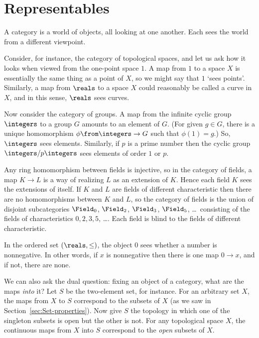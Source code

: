 % 
% 
% 

\chapter{Representables}
\label{ch:rep}


A category is a world of objects, all looking at one another.  Each sees
the world from a different viewpoint.  

Consider, for instance, the category of topological spaces, and let us ask
how it looks when viewed from the one-point space $1$.  A map from $1$ to a
space $X$ is essentially the same thing as a point of $X$, so we might say
that $1$ `sees%
%
%
points'.  Similarly, a map from $\reals$ to a space $X$
could reasonably be called a curve in $X$, and in this sense, $\reals$ sees
curves.

Now consider the category of groups.  A map from the infinite
cyclic group $\integers$%
%
%
to a group $G$ amounts to an element of $G$.  (For given $g \in G$, there
is a unique homomorphism $\phi\from \integers \to G$ such that $\phi(1) =
g$.)  So, $\integers$ sees elements.  Similarly, if $p$ is a prime number
then the cyclic group $\integers/p\integers$ sees elements of order $1$ or
$p$.

Any ring homomorphism between fields is injective, so in the category of
fields,%
%
%
a map $K \to L$ is a way of realizing $L$ as an extension of $K$.  Hence
each field $K$ sees the extensions of itself.  If $K$ and $L$ are fields of
different characteristic then there are no homomorphisms between $K$ and
$L$, so the category of fields is the union of disjoint subcategories
$\Field_0$, $\Field_2$, $\Field_3$, $\Field_5$, \ldots\ consisting of the
fields of characteristics $0, 2, 3, 5$, \ldots.  Each field is blind to the
fields of different characteristic.

In the ordered set $(\reals, \mathord{\leq})$, the object $0$ sees whether
a number is nonnegative.  In other words, if $x$ is nonnegative then
there is one map $0 \to x$, and if not, there are none.

We can also ask the dual question: fixing an object of a category, what are
the maps \emph{into} it?  Let $S$ be the two-element set, for instance.
For an arbitrary set $X$, the maps from $X$ to $S$ correspond to the
subsets of $X$ (as we saw in Section~\ref{sec:Set-properties}).  Now give
$S$ the topology in which one of the singleton subsets is open but the
other is not.  For any topological space $X$, the continuous maps from $X$
into $S$ correspond to the \emph{open} subsets of $X$.

